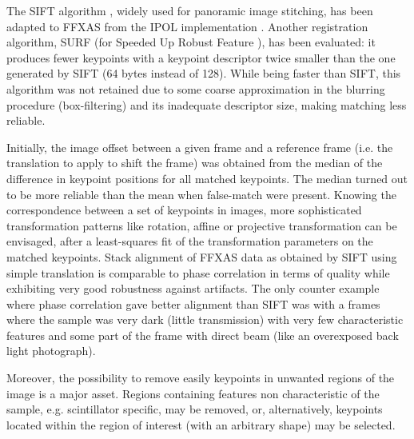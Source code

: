 \documentclass[preprint]{iucr}
\begin{document}
The SIFT algorithm \cite{Lowe99,Lowe04}, widely used for panoramic image
stitching, has been adapted to FFXAS from the IPOL implementation \cite{ASIFT}.
Another registration algorithm, SURF (for Speeded Up Robust Feature
\cite{surf}), has been evaluated: it produces fewer keypoints with a keypoint
descriptor twice smaller than the one generated by SIFT (64 bytes instead of
128).
While being faster than SIFT, this algorithm was not
retained due to some coarse approximation in the blurring procedure
(box-filtering) and its inadequate descriptor size, making matching less
reliable.

Initially, the image offset between a given frame and a reference frame (i.e.
the translation to apply to shift the frame) was obtained from the median
of the difference in keypoint positions for all matched keypoints. The median
turned out to be more reliable than the mean when false-match were present.
Knowing the correspondence between a set of keypoints in images, more
sophisticated transformation patterns like rotation, affine or projective
transformation can be envisaged, after a least-squares fit of the
transformation parameters on the matched keypoints.
Stack alignment of FFXAS data as obtained by SIFT using simple translation is
comparable to phase correlation in terms of quality while exhibiting very good
robustness against artifacts.
The only counter example where phase correlation gave
better alignment than SIFT was with a frames where the sample was very dark
(little transmission) with very few characteristic features and some part of the
frame with direct beam (like an overexposed back light photograph).

Moreover, the possibility to remove easily keypoints in unwanted regions of
the image is a major asset.
Regions containing features non characteristic of the sample, e.g. scintillator
specific, may be removed, or, alternatively, keypoints located within the
region of interest (with an arbitrary shape) may be selected.
\end{document}
